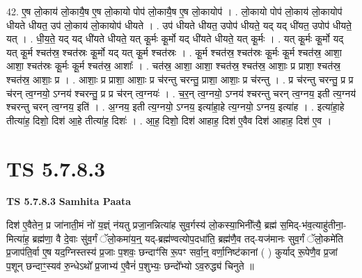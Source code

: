 \documentclass[17pt]{extarticle}
\begin{document}
42. ए॒ष लो॒काय॑ लो॒कायै॒ष ए॒ष लो॒कायो पोप॑ लो॒कायै॒ष ए॒ष लो॒कायोप॑ । . लो॒कायो पोप॑ लो॒काय॑ लो॒कायोप॑ धीयते धीयत॒ उप॑ लो॒काय॑ लो॒कायोप॑ धीयते । . उप॑ धीयते धीयत॒ उपोप॑ धीयते॒ यद् यद् धी॑यत॒ उपोप॑ धीयते॒ यत् । . धी॒य॒ते॒ यद् यद् धी॑यते धीयते॒ यत् कू॒र्मः कू॒र्मो यद् धी॑यते धीयते॒ यत् कू॒र्मः । . यत् कू॒र्मः कू॒र्मो यद् यत् कू॒र्म श्चत॑स्र॒ श्चत॑स्रः कू॒र्मो यद् यत् कू॒र्म श्चत॑स्रः । . कू॒र्म श्चत॑स्र॒ श्चत॑स्रः कू॒र्मः कू॒र्म श्चत॑स्र॒ आशा॒ आशा॒ श्चत॑स्रः कू॒र्मः कू॒र्म श्चत॑स्र॒ आशाः᳚ । . चत॑स्र॒ आशा॒ आशा॒ श्चत॑स्र॒ श्चत॑स्र॒ आशाः॒ प्र प्राशा॒ श्चत॑स्र॒ श्चत॑स्र॒ आशाः॒ प्र । . आशाः॒ प्र प्राशा॒ आशाः॒ प्र च॑रन्तु चरन्तु॒ प्राशा॒ आशाः॒ प्र च॑रन्तु । . प्र च॑रन्तु चरन्तु॒ प्र प्र च॑रन् त्व॒ग्नयो॒ ऽग्नय॑ श्चरन्तु॒ प्र प्र च॑रन् त्व॒ग्नयः॑ । . च॒र॒न् त्व॒ग्नयो॒ ऽग्नय॑ श्चरन्तु चरन् त्व॒ग्नय॒ इती त्य॒ग्नय॑ श्चरन्तु चरन् त्व॒ग्नय॒ इति॑ । . अ॒ग्नय॒ इती त्य॒ग्नयो॒ ऽग्नय॒ इत्या॑हा॒हे त्य॒ग्नयो॒ ऽग्नय॒ इत्या॑ह । . इत्या॑हा॒हे तीत्या॑ह॒ दिशो॒ दिश॑ आ॒हे तीत्या॑ह॒ दिशः॑ । . आ॒ह॒ दिशो॒ दिश॑ आहाह॒ दिश॑ ए॒वैव दिश॑ आहाह॒ दिश॑ ए॒व । \newline
\pagebreak
{}

\section{ TS 5.7.8.3 }

\textbf{TS 5.7.8.3 } \newline
\textbf{Samhita Paata} \newline

दिश॑ ए॒वैतेन॒ प्र जा॑नाती॒मं नो॑ य॒ज्ञ्ं न॑यतु प्रजा॒नन्नित्या॑ह सुव॒र्गस्य॑ लो॒कस्या॒भिनी᳚त्यै॒ ब्रह्म॑ स॒मिद्-भ॑व॒त्याहु॑तीना॒-मित्या॑ह॒ ब्रह्म॑णा॒ वै दे॒वाः सु॑व॒र्गं ॅलो॒कमा॑य॒न्॒ यद्-ब्रह्म॑ण्वत्योप॒दधा॑ति॒ ब्रह्म॑णै॒व तद्-यज॑मानः सुव॒र्गं ॅलो॒कमे॑ति प्र॒जाप॑ति॒र्वा ए॒ष यद॒ग्निस्तस्य॑ प्र॒जाः प॒शवः॒ छन्दाꣳ॑सि रू॒पꣳ सर्वा॒न्॒ वर्णा॒निष्ट॑कानां ( ) कुर्याद् रू॒पेणै॒व प्र॒जां प॒शून् छन्दाꣳ॒॒स्यव॑ रु॒न्धेऽथो᳚ प्र॒जाभ्य॑ ए॒वैनं॑ प॒शुभ्यः॒ छन्दो᳚भ्यो ऽव॒रुद्ध्य॑ चिनुते ॥ \newline
\end{document}
